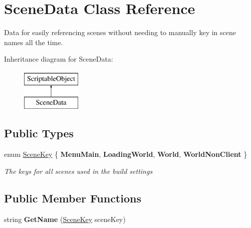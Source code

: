 \hypertarget{class_scene_data}{\section{Scene\-Data Class Reference}
\label{class_scene_data}
}


Data for easily referencing scenes without needing to manually key in scene names all the time.  


Inheritance diagram for Scene\-Data\-:\begin{figure}[H]
\begin{center}
\leavevmode
\includegraphics[height=2.000000cm]{class_scene_data}
\end{center}
\end{figure}
\subsection*{Public Types}
\begin{DoxyCompactItemize}
\item 
enum \hyperlink{class_scene_data_a79d397b3deef242a865470283d96f2e6}{Scene\-Key} \{ {\bfseries Menu\-Main}, 
{\bfseries Loading\-World}, 
{\bfseries World}, 
{\bfseries World\-Non\-Client}
 \}
\begin{DoxyCompactList}\small\item\em The keys for all scenes used in the build settings \end{DoxyCompactList}\end{DoxyCompactItemize}
\subsection*{Public Member Functions}
\begin{DoxyCompactItemize}
\item 
\hypertarget{class_scene_data_a7fae0b056b9093700b9651b9a57e7abb}{string {\bfseries Get\-Name} (\hyperlink{class_scene_data_a79d397b3deef242a865470283d96f2e6}{Scene\-Key} scene\-Key)}\label{class_scene_data_a7fae0b056b9093700b9651b9a57e7abb}

\end{DoxyCompactItemize}
